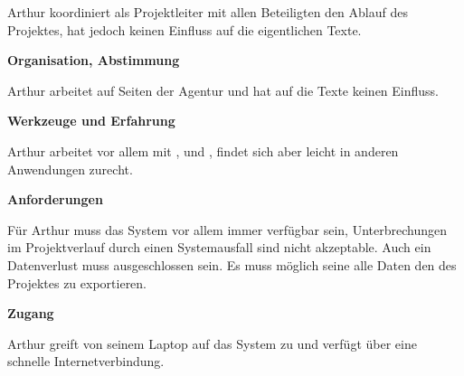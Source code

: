 \begin{multicols}{2}

\begin{center}
\end{center}


Arthur koordiniert als Projektleiter mit allen Beteiligten den Ablauf des Projektes, hat jedoch keinen Einfluss auf die eigentlichen Texte.

\textbf{Organisation, Abstimmung}

Arthur arbeitet auf Seiten der Agentur und hat auf die Texte keinen Einfluss.

\textbf{Werkzeuge und Erfahrung}

Arthur arbeitet vor allem mit ,  und , findet sich aber leicht in anderen Anwendungen zurecht.

\textbf{Anforderungen}

Für Arthur muss das System vor allem immer verfügbar sein, Unterbrechungen im Projektverlauf durch einen Systemausfall sind nicht akzeptable. Auch ein Datenverlust muss ausgeschlossen sein. Es muss möglich seine alle Daten den des Projektes zu exportieren.

\columnbreak

\textbf{Zugang}

Arthur greift von seinem Laptop auf das System zu und verfügt über eine schnelle Internetverbindung.


\end{multicols}
